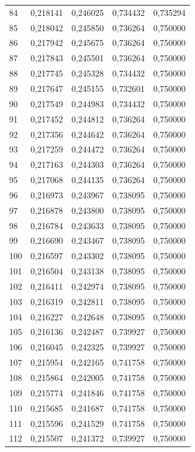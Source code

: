 \begin{tabular}{lrrrr}
84 & 0,218141 & 0,246025 & 0,734432 & 0,735294 \\
85 & 0,218042 & 0,245850 & 0,736264 & 0,750000 \\
86 & 0,217942 & 0,245675 & 0,736264 & 0,750000 \\
87 & 0,217843 & 0,245501 & 0,736264 & 0,750000 \\
88 & 0,217745 & 0,245328 & 0,734432 & 0,750000 \\
89 & 0,217647 & 0,245155 & 0,732601 & 0,750000 \\
90 & 0,217549 & 0,244983 & 0,734432 & 0,750000 \\
91 & 0,217452 & 0,244812 & 0,736264 & 0,750000 \\
92 & 0,217356 & 0,244642 & 0,736264 & 0,750000 \\
93 & 0,217259 & 0,244472 & 0,736264 & 0,750000 \\
94 & 0,217163 & 0,244303 & 0,736264 & 0,750000 \\
95 & 0,217068 & 0,244135 & 0,736264 & 0,750000 \\
96 & 0,216973 & 0,243967 & 0,738095 & 0,750000 \\
97 & 0,216878 & 0,243800 & 0,738095 & 0,750000 \\
98 & 0,216784 & 0,243633 & 0,738095 & 0,750000 \\
99 & 0,216690 & 0,243467 & 0,738095 & 0,750000 \\
100 & 0,216597 & 0,243302 & 0,738095 & 0,750000 \\
101 & 0,216504 & 0,243138 & 0,738095 & 0,750000 \\
102 & 0,216411 & 0,242974 & 0,738095 & 0,750000 \\
103 & 0,216319 & 0,242811 & 0,738095 & 0,750000 \\
104 & 0,216227 & 0,242648 & 0,738095 & 0,750000 \\
105 & 0,216136 & 0,242487 & 0,739927 & 0,750000 \\
106 & 0,216045 & 0,242325 & 0,739927 & 0,750000 \\
107 & 0,215954 & 0,242165 & 0,741758 & 0,750000 \\
108 & 0,215864 & 0,242005 & 0,741758 & 0,750000 \\
109 & 0,215774 & 0,241846 & 0,741758 & 0,750000 \\
110 & 0,215685 & 0,241687 & 0,741758 & 0,750000 \\
111 & 0,215596 & 0,241529 & 0,741758 & 0,750000 \\
112 & 0,215507 & 0,241372 & 0,739927 & 0,750000 \\

\end{tabular}

